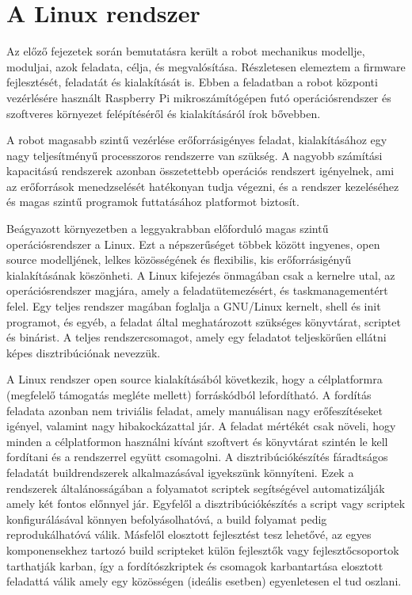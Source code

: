 \chapter{A Linux rendszer}

Az előző fejezetek során bemutatásra került a robot mechanikus modellje,
moduljai, azok feladata, célja, és megvalósítása. Részletesen elemeztem a
firmware fejlesztését, feladatát és kialakítását is. Ebben a feladatban a robot
központi vezérlésére használt Raspberry Pi mikroszámítógépen futó
operációsrendszer és szoftveres környezet felépítéséről és kialakításáról írok
bővebben.

\medskip

A robot magasabb szintű vezérlése erőforrásigényes feladat, kialakításához egy
nagy teljesítményű processzoros rendszerre van szükség. A nagyobb számítási
kapacitású rendszerek azonban összetettebb operációs rendszert igényelnek, ami az
erőforrások menedzselését hatékonyan tudja végezni, és a rendszer kezeléséhez és
magas szintű programok futtatásához platformot biztosít.

Beágyazott környezetben a leggyakrabban előforduló magas szintű operációsrendszer
a Linux. Ezt a népszerűséget többek között ingyenes, open source modelljének,
lelkes közösségének és flexibilis, kis erőforrásigényű kialakításának
köszönheti. A Linux kifejezés önmagában csak a kernelre utal, az
operációsrendszer magjára, amely a feladatütemezésért, és taskmanagementért
felel. Egy teljes rendszer magában foglalja a GNU/Linux kernelt, shell és init
programot, és egyéb, a feladat által meghatározott szükséges könyvtárat, scriptet
és binárist. A teljes rendszercsomagot, amely egy feladatot teljeskörűen ellátni
képes disztribúciónak nevezzük.

\medskip

A Linux rendszer open source kialakításából következik, hogy a célplatformra
(megfelelő támogatás megléte mellett) forráskódból lefordítható. A fordítás
feladata azonban nem triviális feladat, amely manuálisan nagy erőfeszítéseket
igényel, valamint nagy hibakockázattal jár. A feladat mértékét csak növeli, hogy
minden a célplatformon használni kívánt szoftvert és könyvtárat szintén le kell
fordítani és a rendszerrel együtt csomagolni. A disztribúciókészítés fáradtságos
feladatát buildrendszerek alkalmazásával igyekszünk könnyíteni. Ezek a rendszerek
általánosságában a folyamatot scriptek segítségével automatizálják amely két
fontos előnnyel jár. Egyfelől a disztribúciókészítés a script vagy scriptek
konfigurálásával könnyen befolyásolhatóvá, a build folyamat pedig
reprodukálhatóvá válik. Másfelől elosztott fejlesztést tesz lehetővé, az egyes
komponensekhez tartozó build scripteket külön fejlesztők vagy fejlesztőcsoportok
tarthatják karban, így a fordítószkriptek és csomagok karbantartása elosztott
feladattá válik amely egy közösségen (ideális esetben) egyenletesen el tud
oszlani. 

